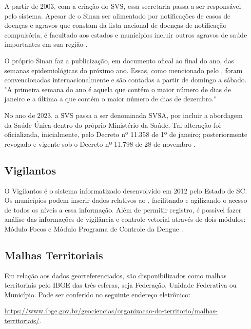 \indent A partir de 2003, com a criação do \acrfull{SVS}, essa secretaria passa a ser responsável pelo sistema. Apesar de o \acrshort{Sinan} ser alimentado por notificações  de casos de doenças e agravos que constam da lista nacional de doenças de notificação compulsória, é facultado aos estados e municípios incluir outros agravos de saúde importantes em sua região \cite{SINANWEB, SINAN07Ministerio}.

\indent O próprio \acrshort{Sinan} faz a publicização, em documento ofical ao final do ano, das semanas epidemiológicas do próximo ano. Essas, como mencionado pelo , foram convencionadas internacionalmente e são contadas a partir de domingo a sábado. "A primeira semana do ano é aquela que contém o maior número de dias de janeiro e a última a que contém o maior número de dias de dezembro."

\indent No ano de 2023, a \acrlong{SVS} passa a ser denominada \acrlong{SVSA}, por incluir a abordagem da Saúde Única dentro do próprio Ministério da Saúde. Tal alteração foi oficializada, inicialmente, pelo Decreto nº 11.358 de 1º de janeiro; posteriormente revogado e vigente sob o Decreto nº 11.798 de 28 de novembro \cite{SVSA2023_1, SVSA2023_2}.

\subsection{Vigilantos}

O Vigilantos é o sistema informatizado  desenvolvido em 2012 pelo Estado de \acrlong{SC}. Os municípios podem inserir dados relativos ao , facilitando e agilizando o acesso de todos os níveis a essa informação. Além de permitir registro, é possível fazer análise das informações de vigilância e controle vetorial através de dois módulos: Módulo Focos e Módulo Programa de Controle da Dengue \cite{Vigilantos}.

\subsection{Malhas Territoriais}

Em relação aos dados georreferenciados, são disponibilizados como malhas territoriais pelo \acrfull{IBGE} das três esferas, seja Federação, Unidade Federativa ou Município. Pode ser conferido no seguinte endereço eletrônico:
\begin{center}
\url{https://www.ibge.gov.br/geociencias/organizacao-do-territorio/malhas-territoriais/}. %
\end{center}

